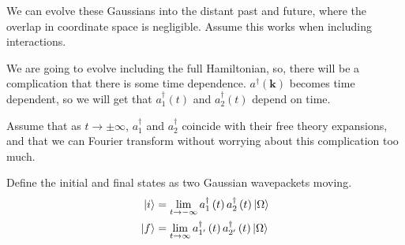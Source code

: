 \documentclass[11pt, oneside]{article}   	%
\theoremstyle{slanted}
\let\vec\mathbf
\begin{document}
We can evolve these Gaussians into the 
distant past and future, 
where the overlap in coordinate space is negligible. 
Assume this works when including interactions. 

We are going to evolve including the full Hamiltonian, so, 
there will be a complication that there is 
some time dependence. $ a ^\dagger \left( \vec{k}  \right)  $  
becomes time dependent, so 
we will get that $ a _  1 ^\dagger \left( t  \right)  $ and $ a _ 2 ^\dagger \left( t  \right)  $ 
depend on time. 

Assume that as $ t \to \pm \infty $, $ a _ 1 ^\dagger $ and $ a _ 2 ^\dagger $ 
coincide with their free theory 
expansions, and that we can Fourier transform 
without worrying about this complication too much. 

Define the initial and final states
as two Gaussian wavepackets moving. 
\begin{align*}
	\ket{ i }  & = \lim _{ t \to- \infty } a _1 ^\dagger \left( t  \right)  a _ 2 ^\dagger \left( t  \right)  \ket{ \Omega } \\
	\ket{ f } &=  \lim_{t \to \infty  } a _{1 ' } ^{ \dagger } \left(  t  \right)
	a _{ 2 ' } ^\dagger \left( t  \right)  \ket{ \Omega } \\
\end{align*}
\end{document}
